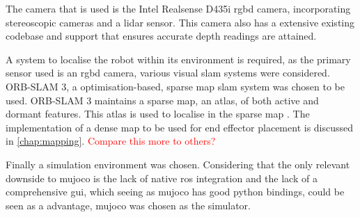 The camera that is used is the Intel Realsense D435i \ac{rgbd} camera, incorporating stereoscopic cameras and a \ac{lidar} sensor. This camera also has a extensive existing codebase and support that ensures accurate depth readings are attained.

A system to localise the robot within its environment is required, as the primary sensor used is an \ac{rgbd} camera, various visual \ac{slam} systems were considered. ORB-SLAM 3, a optimisation-based, sparse map \ac{slam} system was chosen to be used. ORB-SLAM 3 maintains a sparse map, an atlas, of both active and dormant features. This atlas is used to localise in the sparse map \citep{macario2022comprehensive}. The implementation of a dense map to be used for end effector placement is discussed in \autoref{chap:mapping}. \textcolor{red}{Compare this more to others?}

Finally a simulation environment was chosen. Considering that the only relevant downside to \ac{mujoco} is the lack of native \ac{ros} integration and the lack of a comprehensive \ac{gui}, which seeing as \ac{mujoco} has good python bindings, could be seen as a advantage, \ac{mujoco} was chosen as the simulator.
